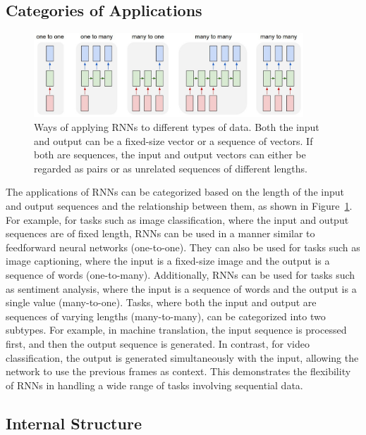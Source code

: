 \documentclass{article}
\newcommand{\reffig}[1]{Figure~\ref{#1}}
\begin{document}
\subsection{Categories of Applications}
\label{sec:2.0}

\begin{figure}[htbp]
  \centering
  \includegraphics[width=0.9\textwidth]{Karpathy application types.jpeg}
  \caption{Ways of applying RNNs to different types of data. Both the input and output can
    be a fixed-size vector or a sequence of vectors. If both are sequences, the input and
    output vectors can either be regarded as pairs or as unrelated sequences of different
    lengths. \cite{karpathyUnreasonableEffectivenessRecurrent}}
  \label{fig:rnn-application-types}
\end{figure}

The applications of RNNs can be categorized based on the length of the input and output
sequences and the relationship between them, as shown in
\reffig{fig:rnn-application-types}. For example, for tasks such as image classification,
where the input and output sequences are of fixed length, RNNs can be used in a manner
similar to feedforward neural networks (one-to-one). They can also be used for tasks such
as image captioning, where the input is a fixed-size image and the output is a sequence of
words (one-to-many). Additionally, RNNs can be used for tasks such as sentiment analysis,
where the input is a sequence of words and the output is a single value (many-to-one).
Tasks, where both the input and output are sequences of varying lengths (many-to-many),
can be categorized into two subtypes. For example, in machine translation, the input
sequence is processed first, and then the output sequence is generated. In contrast, for
video classification, the output is generated simultaneously with the input, allowing the
network to use the previous frames as context. This demonstrates the flexibility of RNNs
in handling a wide range of tasks involving sequential data.


\subsection{Internal Structure}
\label{sec:2.1}
\end{document}
